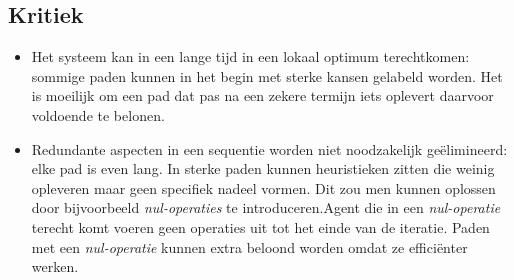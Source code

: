 \subsection{Kritiek}
\begin{itemize}
 \item Het systeem kan in een lange tijd in een lokaal optimum terechtkomen: sommige paden kunnen in het begin met sterke kansen gelabeld worden. Het is moeilijk om een pad dat pas na een zekere termijn iets oplevert daarvoor voldoende te belonen.
 \item Redundante aspecten in een sequentie worden niet noodzakelijk ge\"elimineerd: elke pad is even lang. In sterke paden kunnen heuristieken zitten die weinig opleveren maar geen specifiek nadeel vormen. Dit zou men kunnen oplossen door bijvoorbeeld \emph{nul-operaties} te introduceren.Agent die in een \emph{nul-operatie} terecht komt voeren geen operaties uit tot het einde van de iteratie. Paden met een \emph{nul-operatie} kunnen extra beloond worden omdat ze effici\"enter werken.
\end{itemize}
